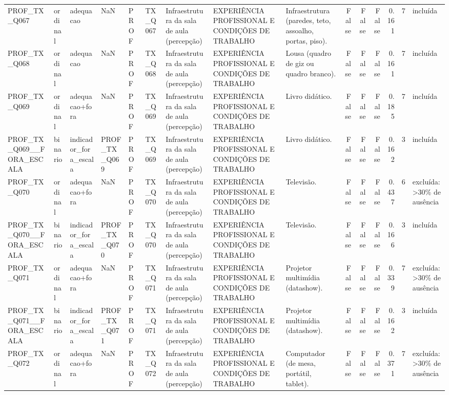 \begin{tabular}{lllllllllrrrrrl}
PROF\_TX\_Q067 & ordinal & adequacao & NaN & PROF & TX\_Q067 & Infraestrutura da sala de aula (percepção) & EXPERIÊNCIA PROFISSIONAL E CONDIÇÕES DE TRABALHO & Infraestrutura (paredes, teto, assoalho, portas, piso). & False & False & False & 0.161 & 7 & incluída \\
PROF\_TX\_Q068 & ordinal & adequacao & NaN & PROF & TX\_Q068 & Infraestrutura da sala de aula (percepção) & EXPERIÊNCIA PROFISSIONAL E CONDIÇÕES DE TRABALHO & Lousa (quadro de giz ou quadro branco). & False & False & False & 0.161 & 7 & incluída \\
PROF\_TX\_Q069 & ordinal & adequacao+fora & NaN & PROF & TX\_Q069 & Infraestrutura da sala de aula (percepção) & EXPERIÊNCIA PROFISSIONAL E CONDIÇÕES DE TRABALHO & Livro didático. & False & False & False & 0.185 & 7 & incluída \\
PROF\_TX\_Q069\_\_FORA\_ESCALA & binario & indicador\_fora\_escala & PROF\_TX\_Q069 & PROF & TX\_Q069 & Infraestrutura da sala de aula (percepção) & EXPERIÊNCIA PROFISSIONAL E CONDIÇÕES DE TRABALHO & Livro didático. & False & False & False & 0.162 & 3 & incluída \\
PROF\_TX\_Q070 & ordinal & adequacao+fora & NaN & PROF & TX\_Q070 & Infraestrutura da sala de aula (percepção) & EXPERIÊNCIA PROFISSIONAL E CONDIÇÕES DE TRABALHO & Televisão. & False & False & False & 0.437 & 6 & excluída: >30\% de ausência \\
PROF\_TX\_Q070\_\_FORA\_ESCALA & binario & indicador\_fora\_escala & PROF\_TX\_Q070 & PROF & TX\_Q070 & Infraestrutura da sala de aula (percepção) & EXPERIÊNCIA PROFISSIONAL E CONDIÇÕES DE TRABALHO & Televisão. & False & False & False & 0.166 & 3 & incluída \\
PROF\_TX\_Q071 & ordinal & adequacao+fora & NaN & PROF & TX\_Q071 & Infraestrutura da sala de aula (percepção) & EXPERIÊNCIA PROFISSIONAL E CONDIÇÕES DE TRABALHO & Projetor multimídia (datashow). & False & False & False & 0.339 & 7 & excluída: >30\% de ausência \\
PROF\_TX\_Q071\_\_FORA\_ESCALA & binario & indicador\_fora\_escala & PROF\_TX\_Q071 & PROF & TX\_Q071 & Infraestrutura da sala de aula (percepção) & EXPERIÊNCIA PROFISSIONAL E CONDIÇÕES DE TRABALHO & Projetor multimídia (datashow). & False & False & False & 0.162 & 3 & incluída \\
PROF\_TX\_Q072 & ordinal & adequacao+fora & NaN & PROF & TX\_Q072 & Infraestrutura da sala de aula (percepção) & EXPERIÊNCIA PROFISSIONAL E CONDIÇÕES DE TRABALHO & Computador (de mesa, portátil, tablet). & False & False & False & 0.371 & 7 & excluída: >30\% de ausência \\

\end{tabular}
